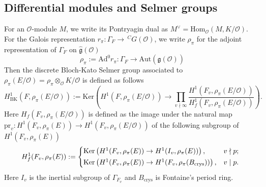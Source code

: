 \documentclass[12pt,oneside,reqno]{amsart}
\theoremstyle{plain}
\begin{document}
	\subsection{Differential modules and Selmer groups}
	For an $\mathcal{O}$-module $M$, we write its Pontryagin dual as $M^\vee=\mathrm{Hom}_\mathcal{O}(M,K/\mathcal{O})$.
	For the Galois representation $r_\pi\colon\Gamma_F\to\,^CG(\mathcal{O})$, we
	write $\rho_\pi$ for the adjoint representation of $\Gamma_F$ on $\widehat{\mathfrak{g}}(\mathcal{O})$
	\[
	\rho_\pi:=\mathrm{Ad}^0r_\pi
	\colon
	\Gamma_F
	\to
	\mathrm{Aut}(\widehat{\mathfrak{g}}(\mathcal{O}))
	\]
	Then the discrete Bloch-Kato Selmer group associated to $\rho_\pi(E/\mathcal{O})=\rho_\pi\otimes_\mathcal{O}K/\mathcal{O}$ is defined as follows
	\[
	H^1_\mathrm{BK}(F,\rho_\pi(E/\mathcal{O}))
	:=
	\mathrm{Ker}
	\left(
	H^1(F,\rho_\pi(E/\mathcal{O}))
	\to
	\prod_{v\nmid\infty}
	\frac{H^1(F_v,\rho_\pi(E/\mathcal{O}))}{H^1_f(F_v,\rho_\pi(E/\mathcal{O}))}
	\right).
	\]
	Here $H_f(F_v,\rho_\pi(E/\mathcal{O}))$ is defined as the image under the natural map $\mathrm{pr}_v\colon H^1(F_v,\rho_\pi(E))\to H^1(F_v,\rho_\pi(E/\mathcal{O}))$ of the following subgroup of $H^1(F_v,\rho_\pi(E))$
	\[
	H_f^1(F_v,\rho_\pi(E))
	:=
	\begin{cases*}
		\mathrm{Ker}
		\left(
		H^1(F_v,\rho_\pi(E))\to
		H^1(I_v,\rho_\pi(E))
		\right),
		&
		$v\nmid p$;
		\\
		\mathrm{Ker}
		\left(
		H^1(F_v,\rho_\pi(E))\to
		H^1(F_v,\rho_\pi(B_\mathrm{crys}))
		\right),
		&
		$v\mid p$.
	\end{cases*}
	\]
	Here $I_v$ is the inertial subgroup of $\Gamma_{F_v}$ and $B_\mathrm{crys}$ is Fontaine's period ring.
	
\end{document}
